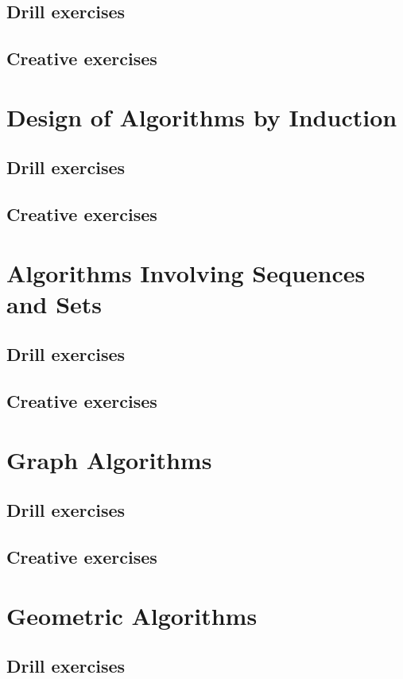 \documentclass[a4paper,11pt]{memoir}
\begin{document}
    \section*{Drill exercises}
    \section*{Creative exercises}

    \chapter{Design of Algorithms by Induction}
    \section*{Drill exercises}
    \section*{Creative exercises}

    \chapter{Algorithms Involving Sequences and Sets}
    \section*{Drill exercises}
    \section*{Creative exercises}

    \chapter{Graph Algorithms}
    \section*{Drill exercises}
    \section*{Creative exercises}

    \chapter{Geometric Algorithms}
    \section*{Drill exercises}
\end{document}
